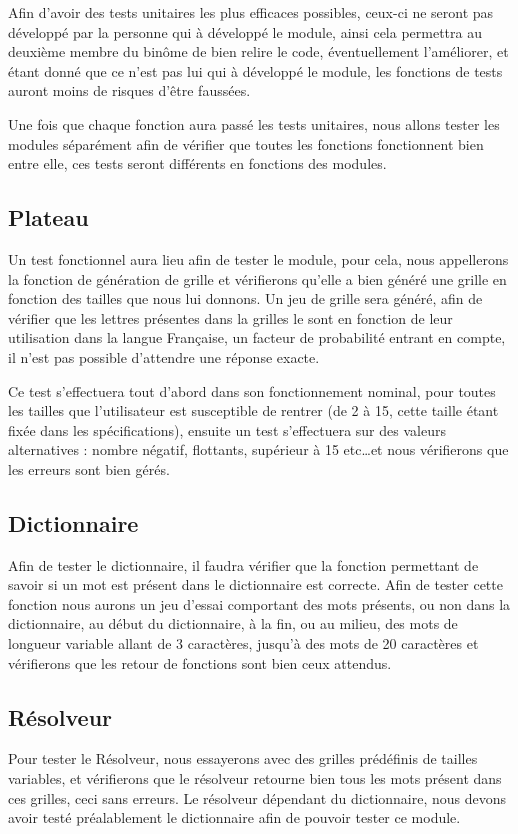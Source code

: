 \documentclass[12pt,a4paper,openany]{article}
\begin{document}
	Afin d'avoir des tests unitaires les plus efficaces possibles, ceux-ci ne seront pas développé par la personne qui à développé le module, ainsi cela
	permettra au deuxième membre du binôme de bien relire le code, éventuellement l'améliorer, et étant donné que ce n'est pas lui qui à développé le module, les
	fonctions de tests auront moins de risques d'être faussées.

	Une fois que chaque fonction aura passé les tests unitaires, nous allons tester les modules séparément afin de vérifier que toutes les fonctions fonctionnent
	bien entre elle, ces tests seront différents en fonctions des modules.

	\subsection{Plateau}
		Un test fonctionnel aura lieu afin de tester le module, pour cela, nous appellerons la fonction de génération de grille et vérifierons qu'elle a bien
		généré une grille en fonction des tailles que nous lui donnons. Un jeu de grille sera généré, afin de vérifier que les lettres présentes dans la grilles
		le sont en fonction de leur utilisation dans la langue Française, un facteur de probabilité entrant en compte, il n'est pas possible d'attendre une
		réponse exacte.

		Ce test s'effectuera tout d'abord dans son fonctionnement nominal, pour toutes les tailles que l'utilisateur est susceptible de rentrer (de 2 à 15, cette
		taille étant fixée dans les spécifications), ensuite un test s'effectuera sur des valeurs alternatives : nombre négatif, flottants, supérieur à 15
		etc\ldots et nous vérifierons que les erreurs sont bien gérés.
	\subsection{Dictionnaire}
		Afin de tester le dictionnaire, il faudra vérifier que la fonction permettant de savoir si un mot est présent dans le
		dictionnaire est correcte. Afin de tester cette fonction nous aurons un jeu d'essai comportant des mots présents, ou non dans la dictionnaire, au début
		du dictionnaire, à la fin, ou au milieu, des mots de longueur variable allant de 3 caractères, jusqu'à des mots de 20 caractères  
		et vérifierons que les retour de fonctions sont bien ceux attendus.

	\subsection{Résolveur}
		Pour tester le Résolveur, nous essayerons avec des grilles prédéfinis de tailles variables, et vérifierons que le résolveur retourne bien tous les
		mots présent dans ces grilles, ceci sans erreurs. Le résolveur dépendant du dictionnaire, nous devons avoir testé préalablement le dictionnaire afin de
		pouvoir tester ce module.
\end{document}
